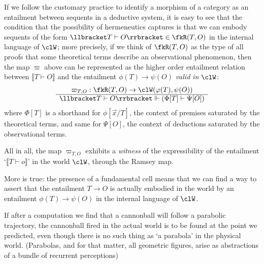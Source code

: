 \begin{remark}\label{herme_explained}
  If we follow the customary practice to identify a morphism of a category as an entailment between sequents in a deductive system, it is easy to see that the condition that the possibility of hermeneutics captures is that we can embody sequents of the form $\llbracket T\vdash O\rrbracket \in \fkR(T,O)$ in the internal language of $\clW$; more precisely, if we think of $\fkR(T,O)$ as the type of all proofs that some theoretical terms describe an observational phenomenon, then the map $\varpi$ above can be represented as the higher order entailment relation between $\llbracket T\vdash O\rrbracket$ and the entailment $\phi(T) \to \psi(O)$ \emph{valid in $\clW$}:
  \[ \begin{array}{c}
      \varpi_{T,O} : \fkR(T,O) \to \clW(\phi(T),\psi(O)) \\ \hline
      \llbracket T\vdash O\rrbracket \Vdash (\Phi[T] \vdash \Psi[O])
    \end{array} \]
  where $\Phi[T]$ is a shorthand for $\phi[\vec x/T]$, the context of premises saturated by the theoretical terms, and same for $\Psi[O]$, the context of deductions saturated by the observational terms.
\end{remark}
All in all, the map $\varpi_{T,O}$ exhibits a \emph{witness} of the expressibility of the entailment `$\llbracket T\vdash o\rrbracket$' in the world $\clW$, through the Ramsey map.

More is true: the presence of a fundamental cell means that we can find a way to assert that the entailment $T\to O$ is actually embodied in the world by an entailment $\phi(T)\to \psi(O)$ in the internal language of $\clW$.

If after a computation we find that a cannonball will follow a parabolic trajectory, the cannonball fired in the actual world is to be found at the point we predicted, even though there is no such thing as `a parabola' in the physical world. (Parabolas, and for that matter, all geometric figures, arise as abstractions of a bundle of recurrent perceptions)

